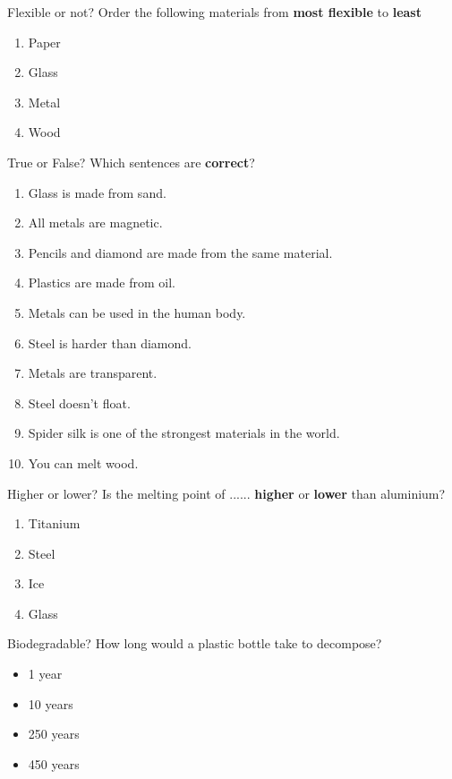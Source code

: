 \documentclass[a4paper, 12pt]{article}
\begin{document}
	\pagestyle{empty}
	\begin{question}[colback=red!10]{Flexible or not?}
  		Order the following materials from \textbf{most flexible} to \textbf{least}
  		
  		\begin{enumerate}[font=\bfseries]
  		\centering
  			\item Paper
  			\item Glass
  			\item Metal
  			\item Wood
  		\end{enumerate}
	\end{question}
	\begin{question}[]{True or False?}
  		Which sentences are \textbf{correct}?
  		
  		\begin{multicols}{2}
  		\begin{enumerate}[font=\bfseries]
  			\item Glass is made from sand.
  			\item All metals are magnetic.
  			\item Pencils and diamond are made from the same material.
  			\item Plastics are made from oil.
  			\item Metals can be used in the human body.
  			\item Steel is harder than diamond.
  			\item Metals are transparent.
  			\item Steel doesn’t float.
  			\item Spider silk is one of the strongest materials in the world.
  			\item You can melt wood.
  		\end{enumerate}
  		\end{multicols}
	\end{question}
	\newpage
	\begin{question}[colback=green!10]{Higher or lower?}
  		Is the melting point of ...... \textbf{higher} or \textbf{lower} than aluminium?
  		\begin{enumerate}
  		\centering
  			\item Titanium
  			\item Steel
  			\item Ice
  			\item Glass
  		\end{enumerate}
	\end{question}
	\begin{question}[colback=cyan!10]{Biodegradable?}
  		How long would a plastic bottle take to decompose?
  		\begin{itemize}
  		\centering
  			\item 1 year
  			\item 10 years
  			\item 250 years
  			\item 450 years
  		\end{itemize}
	\end{question}
\end{document}
